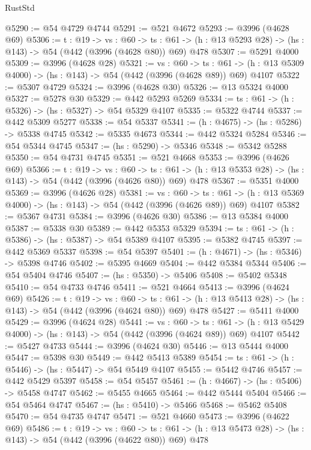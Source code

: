 \begin{lexlean}{RustStd}
\begin{coremodule}
@5290 := @54 @4729 @4744
@5291 := @521 @4672
@5293 := @3996 (@4628 @69)
@5306 := {t : @19} ->
  {vs : @60} ->
  {ts : @61} -> (h : @13 @5293 @28) -> (hs : @143) -> @54 (@442 (@3996 (@4628 @80)) @69) @478
@5307 := @5291 @4000
@5309 := @3996 (@4628 @28)
@5321 := {vs : @60} ->
  {ts : @61} -> (h : @13 @5309 @4000) -> (hs : @143) -> @54 (@442 (@3996 (@4628 @89)) @69) @4107
@5322 := @5307 @4729
@5324 := @3996 (@4628 @30)
@5326 := @13 @5324 @4000
@5327 := @5278 @30
@5329 := @442 @5293 @5269
@5334 := {ts : @61} -> (h : @5326) -> (hs : @5327) -> @54 @5329 @4107
@5335 := @5322 @4744
@5337 := @442 @5309 @5277
@5338 := @54 @5337
@5341 := (h : @4675) -> (hs : @5286) -> @5338 @4745
@5342 := @5335 @4673
@5344 := @442 @5324 @5284
@5346 := @54 @5344 @4745
@5347 := (hs : @5290) -> @5346
@5348 := @5342 @5288
@5350 := @54 @4731 @4745
@5351 := @521 @4668
@5353 := @3996 (@4626 @69)
@5366 := {t : @19} ->
  {vs : @60} ->
  {ts : @61} -> (h : @13 @5353 @28) -> (hs : @143) -> @54 (@442 (@3996 (@4626 @80)) @69) @478
@5367 := @5351 @4000
@5369 := @3996 (@4626 @28)
@5381 := {vs : @60} ->
  {ts : @61} -> (h : @13 @5369 @4000) -> (hs : @143) -> @54 (@442 (@3996 (@4626 @89)) @69) @4107
@5382 := @5367 @4731
@5384 := @3996 (@4626 @30)
@5386 := @13 @5384 @4000
@5387 := @5338 @30
@5389 := @442 @5353 @5329
@5394 := {ts : @61} -> (h : @5386) -> (hs : @5387) -> @54 @5389 @4107
@5395 := @5382 @4745
@5397 := @442 @5369 @5337
@5398 := @54 @5397
@5401 := (h : @4671) -> (hs : @5346) -> @5398 @4746
@5402 := @5395 @4669
@5404 := @442 @5384 @5344
@5406 := @54 @5404 @4746
@5407 := (hs : @5350) -> @5406
@5408 := @5402 @5348
@5410 := @54 @4733 @4746
@5411 := @521 @4664
@5413 := @3996 (@4624 @69)
@5426 := {t : @19} ->
  {vs : @60} ->
  {ts : @61} -> (h : @13 @5413 @28) -> (hs : @143) -> @54 (@442 (@3996 (@4624 @80)) @69) @478
@5427 := @5411 @4000
@5429 := @3996 (@4624 @28)
@5441 := {vs : @60} ->
  {ts : @61} -> (h : @13 @5429 @4000) -> (hs : @143) -> @54 (@442 (@3996 (@4624 @89)) @69) @4107
@5442 := @5427 @4733
@5444 := @3996 (@4624 @30)
@5446 := @13 @5444 @4000
@5447 := @5398 @30
@5449 := @442 @5413 @5389
@5454 := {ts : @61} -> (h : @5446) -> (hs : @5447) -> @54 @5449 @4107
@5455 := @5442 @4746
@5457 := @442 @5429 @5397
@5458 := @54 @5457
@5461 := (h : @4667) -> (hs : @5406) -> @5458 @4747
@5462 := @5455 @4665
@5464 := @442 @5444 @5404
@5466 := @54 @5464 @4747
@5467 := (hs : @5410) -> @5466
@5468 := @5462 @5408
@5470 := @54 @4735 @4747
@5471 := @521 @4660
@5473 := @3996 (@4622 @69)
@5486 := {t : @19} ->
  {vs : @60} ->
  {ts : @61} -> (h : @13 @5473 @28) -> (hs : @143) -> @54 (@442 (@3996 (@4622 @80)) @69) @478

\end{coremodule}
\end{lexlean}
